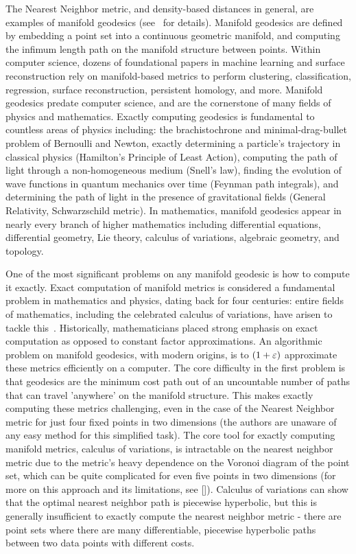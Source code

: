 The Nearest Neighbor metric, and density-based distances in general, are examples of manifold geodesics (see~\cite{} for details).
Manifold geodesics are defined by embedding a point set into a continuous geometric
manifold, and computing the infimum length path on the manifold structure
between points.  Within computer science, dozens of foundational papers in
machine learning and surface reconstruction rely on manifold-based metrics
to perform clustering, classification, regression, surface reconstruction,
persistent homology, and more.  Manifold geodesics
predate computer science, and are the cornerstone of many fields of
physics and mathematics. Exactly computing geodesics is fundamental
to countless areas of physics including: the brachistochrone and
minimal-drag-bullet problem of Bernoulli and Newton, exactly determining a
particle's trajectory in classical physics (Hamilton's Principle of Least
Action), computing the path of light through a non-homogeneous medium
(Snell's law), finding the evolution of wave functions in quantum mechanics
over time (Feynman path integrals), and determining the path of light in
the presence of gravitational fields (General Relativity, Schwarzschild
metric). In mathematics, manifold geodesics appear in nearly every branch
of higher mathematics including differential equations, differential
geometry, Lie theory, calculus of variations, algebraic geometry, and
topology.

One of the most significant problems on any manifold geodesic is how to
compute it exactly. Exact computation of manifold metrics is considered a
fundamental problem in mathematics and physics, dating back for four
centuries: entire fields of mathematics, including the celebrated calculus
of variations, have arisen to tackle this~\cite{}. Historically,
mathematicians placed strong emphasis on exact computation as opposed to
constant factor approximations. An algorithmic problem on manifold
geodesics, with modern origins, is to $(1+\varepsilon)$ approximate these metrics
efficiently on a computer. The core difficulty in the first problem is that
geodesics are the minimum cost path out of an uncountable number of paths
that can travel 'anywhere' on the manifold structure. This makes exactly
computing these metrics challenging, even in the case of the Nearest
Neighbor metric for just four fixed points in two dimensions (the authors
are unaware of any easy method for this simplified task).
The core tool for exactly
computing manifold metrics, calculus of variations, is intractable on the
nearest neighbor metric due to the metric's heavy dependence on the Voronoi
diagram of the point set, which can be quite complicated for even five
points in two dimensions (for more on this approach and its limitations,
see []). Calculus of variations can show that the optimal nearest neighbor
path is piecewise hyperbolic, but this is generally insufficient to exactly
compute the nearest neighbor metric - there are point sets where there are
many differentiable, piecewise hyperbolic paths between two data points with
different costs.


